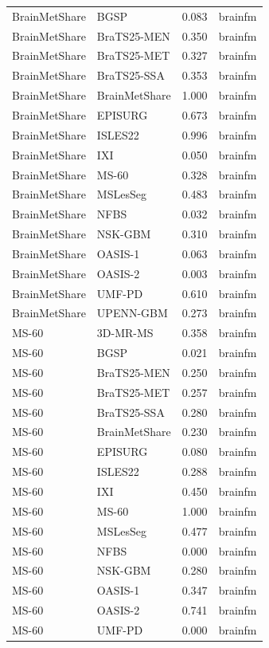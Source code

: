 \begin{tabular}{llrl}
BrainMetShare & BGSP & 0.083 & brainfm \\
BrainMetShare & BraTS25-MEN & 0.350 & brainfm \\
BrainMetShare & BraTS25-MET & 0.327 & brainfm \\
BrainMetShare & BraTS25-SSA & 0.353 & brainfm \\
BrainMetShare & BrainMetShare & 1.000 & brainfm \\
BrainMetShare & EPISURG & 0.673 & brainfm \\
BrainMetShare & ISLES22 & 0.996 & brainfm \\
BrainMetShare & IXI & 0.050 & brainfm \\
BrainMetShare & MS-60 & 0.328 & brainfm \\
BrainMetShare & MSLesSeg & 0.483 & brainfm \\
BrainMetShare & NFBS & 0.032 & brainfm \\
BrainMetShare & NSK-GBM & 0.310 & brainfm \\
BrainMetShare & OASIS-1 & 0.063 & brainfm \\
BrainMetShare & OASIS-2 & 0.003 & brainfm \\
BrainMetShare & UMF-PD & 0.610 & brainfm \\
BrainMetShare & UPENN-GBM & 0.273 & brainfm \\
MS-60 & 3D-MR-MS & 0.358 & brainfm \\
MS-60 & BGSP & 0.021 & brainfm \\
MS-60 & BraTS25-MEN & 0.250 & brainfm \\
MS-60 & BraTS25-MET & 0.257 & brainfm \\
MS-60 & BraTS25-SSA & 0.280 & brainfm \\
MS-60 & BrainMetShare & 0.230 & brainfm \\
MS-60 & EPISURG & 0.080 & brainfm \\
MS-60 & ISLES22 & 0.288 & brainfm \\
MS-60 & IXI & 0.450 & brainfm \\
MS-60 & MS-60 & 1.000 & brainfm \\
MS-60 & MSLesSeg & 0.477 & brainfm \\
MS-60 & NFBS & 0.000 & brainfm \\
MS-60 & NSK-GBM & 0.280 & brainfm \\
MS-60 & OASIS-1 & 0.347 & brainfm \\
MS-60 & OASIS-2 & 0.741 & brainfm \\
MS-60 & UMF-PD & 0.000 & brainfm \\

\end{tabular}
